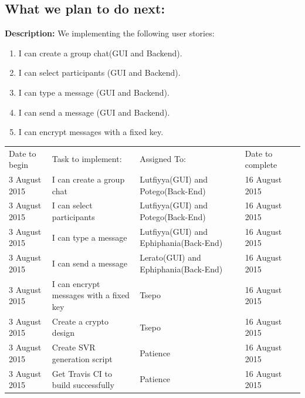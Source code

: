 \documentclass[a4paper]{article}
\begin{document}
\subsection{What we plan to do next:}
\textbf{Description: }We implementing the following user stories:
\begin{enumerate} 
\item I can create a group chat(GUI and Backend).
\item I can select participants (GUI and Backend).
\item I can type a message (GUI and Backend).
\item I can send a message (GUI and Backend).
\item I can encrypt messages with a fixed key.
\end{enumerate}

\setlength{\arrayrulewidth}{0.5mm}
\setlength{\tabcolsep}{12pt}
\renewcommand{\arraystretch}{2} 
\begin{tabular}{ |p{3cm}|p{3cm}|p{3cm}|p{3cm}|p{3cm}|  }
\hline
\rowcolor{lightgray}\multicolumn{4}{|c|}{Work to Complete} \\
\hline 
Date to begin & Task to implement: & Assigned To: & Date to complete\\
\hline
3 August 2015 & I can create a group chat & Lutfiyya(GUI) and  Potego(Back-End) & 16 August 2015\\ 
\hline
3 August 2015 & I can select participants & Lutfiyya(GUI) and Potego(Back-End) & 16 August 2015\\ 
\hline
3 August 2015 & I can type a message & Lutfiyya(GUI) and Ephiphania(Back-End) & 16 August 2015\\ 
\hline
3 August 2015 & I can send a message & Lerato(GUI) and Ephiphania(Back-End) & 16 August 2015\\ 
\hline
3 August 2015 & I can encrypt messages with a fixed key & Tsepo  & 16 August 2015\\ 
\hline
3 August 2015 & Create a crypto design & Tsepo  & 16 August 2015\\ 
\hline

3 August 2015 & Create SVR generation script & Patience & 16 August 2015\\ 
\hline
3 August 2015 & Get Travis CI to build successfully & Patience & 16 August 2015\\ 
\hline

\end{tabular}
\end{document}
